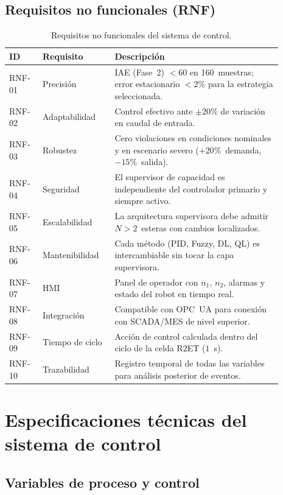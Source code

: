 \subsection*{Requisitos no funcionales (RNF)}

\begin{table}[H]
\centering
\small
\caption{Requisitos no funcionales del sistema de control.}
\label{tab:req_nofunc}
\begin{tabular}{@{}P{0.11\linewidth}P{0.23\linewidth}P{0.55\linewidth}@{}}
\toprule
ID & Requisito & Descripción \\ \midrule
RNF-01 & Precisión & IAE (Fase~2) $<60$ en 160~muestras; error estacionario $<2\%$ para la estrategia seleccionada.\\
RNF-02 & Adaptabilidad & Control efectivo ante $\pm20\%$ de variación en caudal de entrada.\\
RNF-03 & Robustez & Cero violaciones en condiciones nominales y en escenario severo ($+20\%$~demanda, $-15\%$~salida).\\
RNF-04 & Seguridad & El supervisor de capacidad es independiente del controlador primario y siempre activo.\\
RNF-05 & Escalabilidad & La arquitectura supervisora debe admitir $N>2$~esteras con cambios localizados.\\
RNF-06 & Mantenibilidad & Cada método (PID, Fuzzy, DL, QL) es intercambiable sin tocar la capa supervisora.\\
RNF-07 & HMI & Panel de operador con $n_1$, $n_2$, alarmas y estado del robot en tiempo real.\\
RNF-08 & Integración & Compatible con OPC~UA para conexión con SCADA/MES de nivel superior.\\
RNF-09 & Tiempo de ciclo & Acción de control calculada dentro del ciclo de la celda R2ET ($1$~s).\\
RNF-10 & Trazabilidad & Registro temporal de todas las variables para análisis posterior de eventos.\\
\bottomrule
\end{tabular}
\end{table}

\section{Especificaciones técnicas del sistema de control}

\subsection*{Variables de proceso y control}

